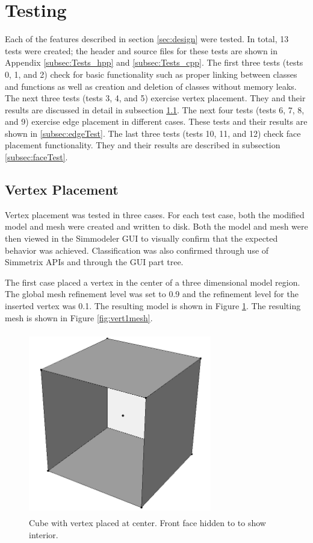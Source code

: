 \documentclass[a4paper, 12pt]{article}
\begin{document}
\section{Testing} \label{sec:testing}
Each of the features described in section \ref{sec:design} were
tested. In total, 13 tests were created; the header and
source files for these tests are shown in 
Appendix \ref{subsec:Tests_hpp} and \ref{subsec:Tests_cpp}. The first three
tests (tests 0, 1, and 2) check for basic functionality such as proper linking 
between classes and functions as well as creation and deletion of classes 
without memory leaks. The next three tests (tests 3, 4, and 5) 
exercise vertex placement. They and their results are discussed in detail
in subsection \ref{subsec:vertexTest}. The next four tests (tests 6, 7, 8, and 9)
exercise edge placement in different cases. These tests and their results 
are shown in \ref{subsec:edgeTest}. The last three tests (tests 10, 11, and 12)
check face placement functionality. They and their results are described in 
subsection \ref{subsec:faceTest}.

\subsection{Vertex Placement} \label{subsec:vertexTest}
Vertex placement was tested in three cases. For each test case, both
the modified model and mesh were created and written to disk. Both 
the model and mesh were then viewed in the Simmodeler GUI to visually confirm
that the expected behavior was achieved. Classification was also confirmed
through use of Simmetrix APIs and through the GUI part tree. 

The first case placed a vertex in the center of a three dimensional
model region. The global mesh refinement level was set to 0.9 and the 
refinement level for the inserted vertex was 0.1.
The resulting model is shown in Figure \ref{fig:vert1model}.
The resulting mesh is shown in Figure \ref{fig:vert1mesh}.

\begin{figure}[H]
  \centering
  \includegraphics[width=8cm, height=8cm]{test3_smd}
  \caption{Cube with vertex placed at center. Front face hidden to 
        to show interior.}
  \label{fig:vert1model}
\end{figure}
\end{document}
